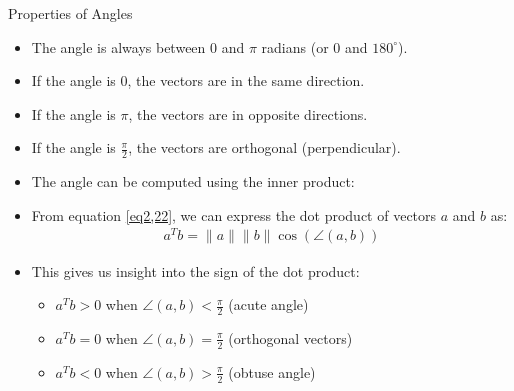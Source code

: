 \begin{frame}{Properties of Angles}
\begin{itemize}
    \item The angle is always between $0$ and $\pi$ radians (or $0$ and $180^\circ$).
    \item If the angle is $0$, the vectors are in the same direction.
    \item If the angle is $\pi$, the vectors are    in opposite directions. 
    \item If the angle is $\frac{\pi}{2}$, the vectors are orthogonal (perpendicular).
    \item The angle can be computed using the inner product:
\end{itemize}
\end{frame}


\begin{frame}{}
\begin{itemize}
    \item From equation \ref{eq2,22}, we can express the dot product of vectors $a$ and $b$ as:
    \begin{align}
        a^T b = \|a\| \|b\| \cos(\angle(a, b))
    \end{align}
    \item This gives us insight into the sign of the dot product:
    \begin{itemize}
        \item $a^T b > 0$ when $\angle(a, b) < \frac{\pi}{2}$ (acute angle)
        \item $a^T b = 0$ when $\angle(a, b) = \frac{\pi}{2}$ (orthogonal vectors)
        \item $a^T b < 0$ when $\angle(a, b) > \frac{\pi}{2}$ (obtuse angle)
    \end{itemize}
\end{itemize}
\end{frame}

